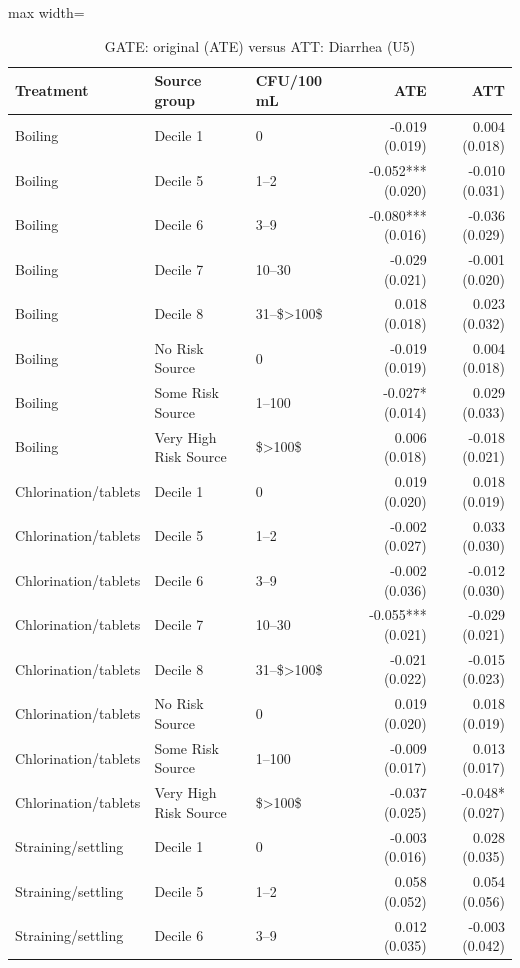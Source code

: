 \begin{table}[htbp]
\centering\scriptsize
\caption{GATE: original (ATE) versus ATT: Diarrhea (U5)}
\label{tab:table-ate-att-heterogeneity-gates-diarrhea}
\begin{adjustbox}{max width=\linewidth}
\begin{tabular}{lllrr}
\toprule
Treatment & Source group & CFU/100 mL & ATE & ATT \\
\midrule
Boiling & Decile 1 & 0 & -0.019 (0.019) & 0.004 (0.018) \\
Boiling & Decile 5 & 1--2 & -0.052*** (0.020) & -0.010 (0.031) \\
Boiling & Decile 6 & 3--9 & -0.080*** (0.016) & -0.036 (0.029) \\
Boiling & Decile 7 & 10--30 & -0.029 (0.021) & -0.001 (0.020) \\
Boiling & Decile 8 & 31--\$\textgreater{}100\$ & 0.018 (0.018) & 0.023 (0.032) \\
Boiling & No Risk Source & 0 & -0.019 (0.019) & 0.004 (0.018) \\
Boiling & Some Risk Source & 1--100 & -0.027* (0.014) & 0.029 (0.033) \\
Boiling & Very High Risk Source & \$\textgreater{}100\$ & 0.006 (0.018) & -0.018 (0.021) \\
Chlorination/tablets & Decile 1 & 0 & 0.019 (0.020) & 0.018 (0.019) \\
Chlorination/tablets & Decile 5 & 1--2 & -0.002 (0.027) & 0.033 (0.030) \\
Chlorination/tablets & Decile 6 & 3--9 & -0.002 (0.036) & -0.012 (0.030) \\
Chlorination/tablets & Decile 7 & 10--30 & -0.055*** (0.021) & -0.029 (0.021) \\
Chlorination/tablets & Decile 8 & 31--\$\textgreater{}100\$ & -0.021 (0.022) & -0.015 (0.023) \\
Chlorination/tablets & No Risk Source & 0 & 0.019 (0.020) & 0.018 (0.019) \\
Chlorination/tablets & Some Risk Source & 1--100 & -0.009 (0.017) & 0.013 (0.017) \\
Chlorination/tablets & Very High Risk Source & \$\textgreater{}100\$ & -0.037 (0.025) & -0.048* (0.027) \\
Straining/settling & Decile 1 & 0 & -0.003 (0.016) & 0.028 (0.035) \\
Straining/settling & Decile 5 & 1--2 & 0.058 (0.052) & 0.054 (0.056) \\
Straining/settling & Decile 6 & 3--9 & 0.012 (0.035) & -0.003 (0.042) \\

\end{tabular}
\end{adjustbox}
\end{table}
